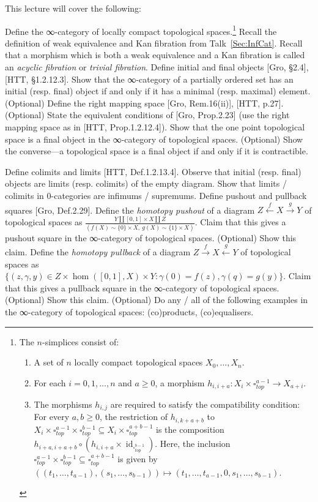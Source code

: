 \documentclass[a4paper]{amsart}
\numberwithin{figure}{section}
\theoremstyle{theorem}
\theoremstyle{definition}
\DeclareMathOperator{\id}{id}
\begin{document}
This lecture will cover the following:

Define the ∞-category of locally compact topological spaces.\footnote{%
The $n$-simplices consist of:
\begin{enumerate}
 \item A set of $n$ locally compact topological spaces $X_0, \dots, X_n$.
 \item For each $i = 0, 1, \dots, n$ and $a \geq 0$, a morphism $h_{i,i{+}a}: X_i {\times} \square^{a{-}1}_{top}   \to X_{a{+}i}$.
 \item The morphisms $h_{i,j}$ are required to satisfy the compatibility condition: For every $a, b \geq 0$, the restriction of $h_{i,k{+}a{+}b}$ to $X_i{\times}\square^{a{-}1}_{top} {\times} \square^{b{-}1}_{top} \subseteq X_i{\times}\square^{a{+}b{-}1}_{top}$ is the composition $h_{i{+}a,i{+}a{+}b} \circ (h_{i,i{+}a} \times \id_{\square^{b{-}1}_{top}})$. Here, the inclusion $\square^{a{-}1}_{top} {\times} \square^{b{-}1}_{top} \subseteq \square^{a{+}b{-}1}_{top}$ is given by $((t_1, \dots, t_{a-1}), (s_1, \dots, s_{b-1})) \mapsto (t_1, \dots, t_{a-1}, 0, s_1, \dots, s_{b-1})$.
\end{enumerate}
} %
Recall the definition of weak equivalence and Kan fibration from Talk~\ref{Sec:InfCat}. %
Recall that a morphism which is both a weak equivalence and a Kan fibration is called an \emph{acyclic fibration} or \emph{trivial fibration}. %
Define initial and final objects [Gro, §2.4], [HTT, §1.2.12.3]. %
Show that the ∞-category of a partially ordered set has an initial (resp. final) object if and only if it has a minimal (resp. maximal) element. %
(Optional) Define the right mapping space [Gro, Rem.16(ii)], [HTT, p.27]. %
(Optional) State the equivalent conditions of [Gro, Prop.2.23] (use the right mapping space as in [HTT, Prop.1.2.12.4]). %
Show that the one point topological space is a final object in the ∞-category of topological spaces. %
(Optional) Show the converse---a topological space is a final object if and only if it is contractible. %

Define colimits and limits [HTT, Def.1.2.13.4]. %
Observe that initial (resp. final) objects are limits (resp. colimits) of the empty diagram. %
Show that limits / colimits in 0-categories are infimums / supremums. %
Define pushout and pullback squares [Gro, Def.2.29]. %
Define the \emph{homotopy pushout} of a diagram $Z \stackrel{f}{\leftarrow} X \stackrel{g}{\to} Y$  of topological spaces as $ \frac{Y \amalg [0,1]\times X \amalg Z}{(f(X) \sim \{0\} \times X, \ g(X) \sim \{1\} \times X)}$. %
Claim that this gives a pushout square in the ∞-category of topological spaces. %
(Optional) Show this claim. %
Define the \emph{homotopy pullback} of a diagram $Z \stackrel{f}{\rightarrow} X \stackrel{g}{\leftarrow} Y$  of topological spaces as $\{( z, \gamma, y) \in Z \times \hom([0,1], X) \times Y : \gamma(0) = f(z), \gamma(q) = g(y) \}$. %
Claim that this gives a pullback square in the ∞-category of topological spaces. %
(Optional) Show this claim. %
(Optional) Do any / all of the following examples in the ∞-category of topological spaces: (co)products, (co)equalisers. 
\end{document}
